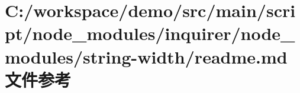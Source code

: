 \hypertarget{node__modules_2inquirer_2node__modules_2string-width_2_r_e_a_d_m_e_8md}{}\section{C\+:/workspace/demo/src/main/script/node\+\_\+modules/inquirer/node\+\_\+modules/string-\/width/readme.md 文件参考}
\label{node__modules_2inquirer_2node__modules_2string-width_2_r_e_a_d_m_e_8md}
